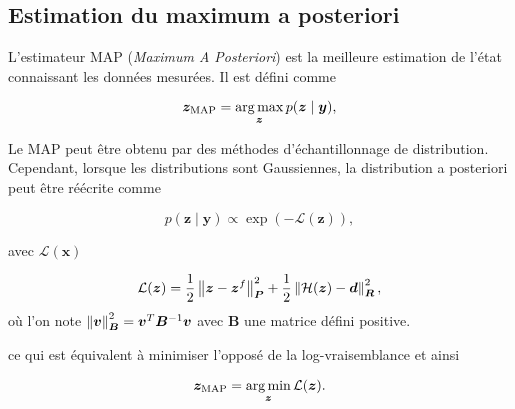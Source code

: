 \subsection{Estimation du maximum a posteriori}

L'estimateur MAP (\textit{Maximum A Posteriori}) est la meilleure estimation de l'état connaissant les données mesurées. Il est défini comme

\begin{equation*}
    \bm z_{\text{MAP}} = \operatorname*{arg\,max}_{\bm z} p(\bm z \mid \bm y),
\end{equation*}

Le MAP peut être obtenu par des méthodes d'échantillonnage de distribution. Cependant, lorsque les distributions sont Gaussiennes, la distribution a posteriori peut être réécrite comme



\begin{equation*}
    p(\bm z \mid \bm y) \propto \exp\left(- \mathcal{L}(\bm z)\right),
\end{equation*}

avec $\mathcal L(\bm x)$

\begin{equation*}
    \mathcal L(\bm z) = \frac12 \left\lVert \bm z - \bm z^f \right\rVert^2_{ \bm{P}} + \frac12 \left\lVert \mathcal H(\bm z) - \bm d \right\rVert^2_{\bm{R}},
\end{equation*}où l'on note $\left\lVert \bm v \right\rVert^2_{\bm B} = \bm v^T \bm B^{-1} \bm v$ avec $\bm B$ une matrice défini positive.

ce qui est équivalent à minimiser l'opposé de la log-vraisemblance et ainsi

\begin{equation*}
    \bm z_{\text{MAP}} = \operatorname*{arg\,min}_{\bm z} \mathcal L(\bm z).
\end{equation*}

